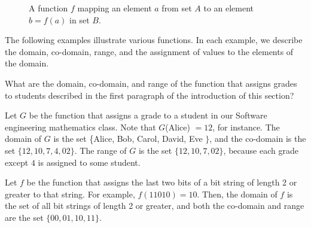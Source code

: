 \begin{figure}[htbp]
\centering
{}
\caption{A function \(f\) mapping an element \(a\) from set \(A\) to an element \(b=f(a)\) in set \(B\).}
\label{fig:function_mapping}
\end{figure}

The following examples illustrate various functions. In each example, we describe the domain, co-domain, range, and the assignment of values to the elements of the domain.

\begin{example} What are the domain, co-domain, and range of the function that assigns grades to students described in the first paragraph of the introduction of this section?

\begin{solution}
    Let $G$ be the function that assigns a grade to a student in our Software engineering mathematics class. Note that $G$(Alice) $=12$, for instance. The domain of $G$ is the set \{Alice, Bob, Carol, David, Eve $\}$, and the co-domain is the set $\{12, 10, 7, 4, 02\}$. The range of $G$ is the set $\{12, 10, 7, 02\}$, because each grade except $4$ is assigned to some student.
\end{solution}
    
\end{example}

\begin{example}
    Let $f$ be the function that assigns the last two bits of a bit string of length 2 or greater to that string. For example, $f(11010)=10$. Then, the domain of $f$ is the set of all bit strings of length 2 or greater, and both the co-domain and range are the set $\{00,01,10,11\}$.
\end{example}

